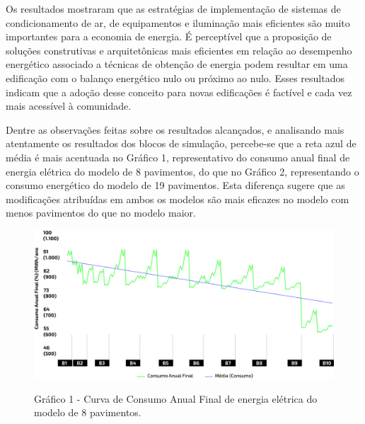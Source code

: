 \begin{onehalfspace}
    \noindent Os resultados mostraram que as estratégias de implementação de sistemas
    de condicionamento de ar, de equipamentos e iluminação mais eficientes são muito importantes
    para a economia de energia. É perceptível que a proposição de soluções construtivas e
    arquitetônicas mais eficientes em relação ao desempenho energético associado a técnicas de
    obtenção de energia podem resultar em uma edificação com o balanço energético nulo ou
    próximo ao nulo. Esses resultados indicam que a adoção desse conceito para novas edificações é
    factível e cada vez mais acessível à comunidade.\vspace*{0.3cm}

    \noindent Dentre as observações feitas sobre os resultados alcançados, e analisando 
    mais atentamente os resultados dos blocos de simulação, percebe-se que a reta azul de 
    média é mais acentuada no Gráfico 1, representativo do consumo anual final de energia 
    elétrica do modelo de 8 pavimentos, do que no Gráfico 2, representando o consumo 
    energético do modelo de 19 pavimentos. Esta diferença sugere que as modificações 
    atribuídas em ambos os modelos são mais eficazes no modelo com menos pavimentos do que 
    no modelo maior.\vspace*{0.3cm}
    \begin{figure}[H]
        \centering
        \includegraphics[width=1\textwidth]{figures/grafico-8pav.png}
        \begin{flushleft}
            \small Gráfico 1 - Curva de Consumo Anual Final de energia elétrica do modelo de 8 pavimentos.
        \end{flushleft}
    \end{figure}


\end{onehalfspace}
